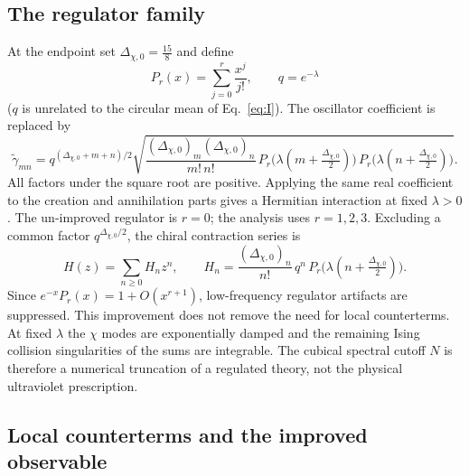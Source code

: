 \documentclass[11pt,a4paper]{article}
\numberwithin{equation}{section}
\begin{document}
\subsection{The regulator family}\label{app:cyl:regulator}
At the endpoint set $\Delta_{\chi,0}=\frac{15}{8}$ and define
\begin{equation}
 P_r(x)=\sum_{j=0}^r\frac{x^j}{j!},\qquad q=e^{-\lambda}
\end{equation}
($q$ is unrelated to the circular mean of Eq.~\eqref{eq:I}). The oscillator coefficient is replaced by
\begin{equation}
 \tilde\gamma_{mn}=q^{(\Delta_{\chi,0}+m+n)/2}\sqrt{\frac{(\Delta_{\chi,0})_m(\Delta_{\chi,0})_n}{m!\,n!}\,
 P_r\bigl(\lambda(m+\tfrac{\Delta_{\chi,0}}{2})\bigr)\,P_r\bigl(\lambda(n+\tfrac{\Delta_{\chi,0}}{2})\bigr)}.
 \label{eq:cyl:regc}
\end{equation}
All factors under the square root are positive. Applying the same real coefficient to the creation and annihilation
parts gives a Hermitian interaction at fixed $\lambda>0$. The un-improved regulator is $r=0$; the analysis uses
$r=1,2,3$. Excluding a common factor $q^{\Delta_{\chi,0}/2}$, the chiral contraction series is
\begin{equation}
 H(z)=\sum_{n\ge0}H_nz^n,\qquad
 H_n=\frac{(\Delta_{\chi,0})_n}{n!}\,q^n\,P_r\bigl(\lambda(n+\tfrac{\Delta_{\chi,0}}{2})\bigr).
 \label{eq:cyl:Hseries}
\end{equation}
Since $e^{-x}P_r(x)=1+O(x^{r+1})$, low-frequency regulator artifacts are suppressed. This improvement does not remove
the need for local counterterms. At fixed $\lambda$ the $\chi$ modes are exponentially damped and the remaining Ising
collision singularities of the sums are integrable. The cubical spectral cutoff $N$ is therefore a numerical truncation
of a regulated theory, not the physical ultraviolet prescription.

\subsection{Local counterterms and the improved observable}\label{app:cyl:counterterms}
\end{document}
